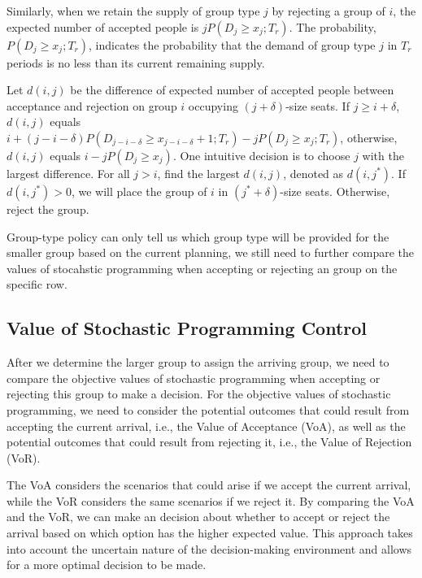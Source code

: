 Similarly, when we retain the supply of group type $j$ by rejecting a group of $i$, the expected number of accepted people is $j P(D_{j} \geq x_{j}; T_r)$. The probability, $P(D_{j} \geq x_{j}; T_r)$, indicates the probability that the demand of group type $j$ in $T_r$ periods is no less than its current remaining supply.

Let $d(i,j)$ be the difference of expected number of accepted people between acceptance and rejection on group $i$ occupying $(j+\delta)$-size seats. If $j \geq i+\delta$, $d(i,j)$ equals $i + (j-i-\delta)P(D_{j-i-\delta} \geq x_{j-i-\delta}+1; T_r) - j P(D_{j} \geq x_{j}; T_r)$, otherwise, $d(i,j)$ equals $i - j P(D_{j} \geq x_{j})$. One intuitive decision is to choose $j$ with the largest difference. For all $j >i$, find the largest $d(i,j)$, denoted as $d(i,j^{*})$. If $d(i,j^{*}) >0$, we will place the group of $i$ in $(j^{*}+\delta)$-size seats. Otherwise, reject the group.

Group-type policy can only tell us which group type will be provided for the smaller group based on the current planning, we still need to further compare the values of stocahstic programming when accepting or rejecting an group on the specific row. 




\subsection{Value of Stochastic Programming Control}
After we determine the larger group to assign the arriving group, we need to compare the objective values of stochastic programming when accepting or rejecting this group to make a decision. For the objective values of stochastic programming, we need to consider the potential outcomes that could result from accepting the current arrival, i.e., the Value of Acceptance (VoA), as well as the potential outcomes that could result from rejecting it, i.e., the Value of Rejection (VoR).

The VoA considers the scenarios that could arise if we accept the current arrival, while the VoR considers the same scenarios if we reject it. By comparing the VoA and the VoR, we can make an decision about whether to accept or reject the arrival based on which option has the higher expected value. This approach takes into account the uncertain nature of the decision-making environment and allows for a more optimal decision to be made. 

